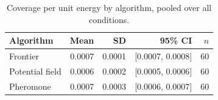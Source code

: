 \begin{table}[t]
\centering
\caption{Coverage per unit energy by algorithm, pooled over all conditions.}
\label{tab:descriptive-cpe}
\begin{tabular}{lrrrr}
\toprule
Algorithm & Mean & SD & 95\% CI & $n$ \\
\midrule
Frontier & 0.0007 & 0.0001 & [0.0007, 0.0008] & 60 \\
Potential field & 0.0006 & 0.0002 & [0.0005, 0.0006] & 60 \\
Pheromone & 0.0007 & 0.0003 & [0.0006, 0.0007] & 60 \\
\bottomrule
\end{tabular}
\end{table}

